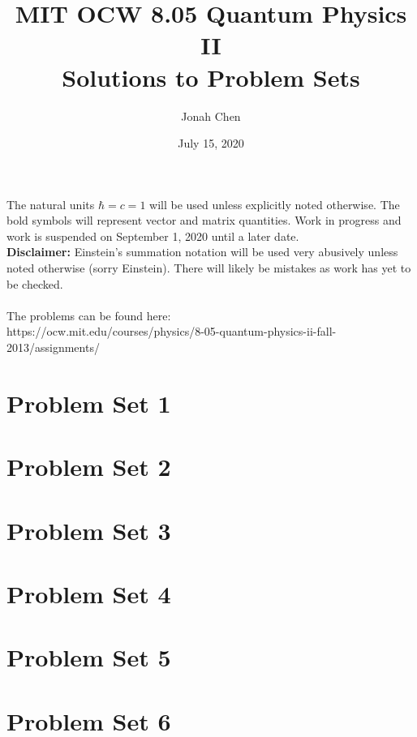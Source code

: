 \documentclass[a4paper]{article}
\title{MIT OCW 8.05 Quantum Physics II \\ Solutions to Problem Sets}
\author{Jonah Chen}
\date{July 15, 2020}
\begin{document}
\maketitle
\noindent The natural units $\hbar=c=1$ will be used unless explicitly noted otherwise. The bold symbols will represent vector and matrix quantities. Work in progress and work is suspended on September 1, 2020 until a later date. \\\textbf{Disclaimer:} Einstein's summation notation will be used very abusively unless noted otherwise (sorry Einstein). There will likely be mistakes as work has yet to be checked.\\\\The problems can be found here:\\https://ocw.mit.edu/courses/physics/8-05-quantum-physics-ii-fall-2013/assignments/
\tableofcontents


\newpage
\section{Problem Set 1}
	
	
	
    
    
    
    
\section{Problem Set 2}
    
    
    
    
    
    
\section{Problem Set 3}
	
    
    
    
    
    
\section{Problem Set 4}
	
    
    
    
    
    
    
\section{Problem Set 5}
    
    
    
    
    
    
    
    
    
\section{Problem Set 6}
    
    
    
    
    
    
\end{document}
